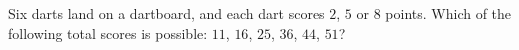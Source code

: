Six darts land on a dartboard, and each dart scores $2$, $5$ or $8$ points. Which of the following total scores is possible: $11$, $16$, $25$, $36$, $44$, $51$?
